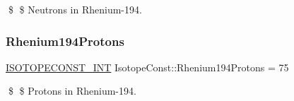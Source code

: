 \$ \$ Neutrons in Rhenium-\/194. \mbox{\label{group___isotope_const-_rhenium-_re194_ga3477d09ae3eb955b2868533910614c5f}} 
\subsubsection{\texorpdfstring{Rhenium194\+Protons}{Rhenium194Protons}}
{\footnotesize\ttfamily \mbox{\hyperlink{group___isotope_const-_macros_ga5f18360b3e99483a35c32d789e62621c}{I\+S\+O\+T\+O\+P\+E\+C\+O\+N\+S\+T\+\_\+\+I\+NT}} Isotope\+Const\+::\+Rhenium194\+Protons = 75}

\$ \$ Protons in Rhenium-\/194. 